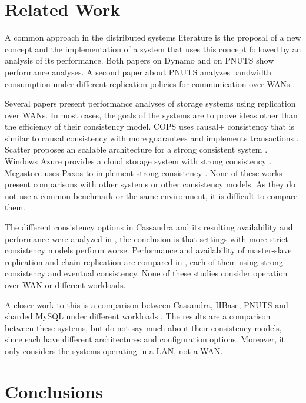 \documentclass[doublespacing]{bmcart}
\begin{document}
\section{Related Work}

A common approach in the distributed systems literature is the proposal of a new
concept and the implementation of a system that uses this concept followed by an
analysis of its performance. Both papers on Dynamo \cite{DeCandia2007} and on
PNUTS \cite{Cooper2008} show performance analyses. A second paper about PNUTS analyzes bandwidth consumption
under different replication policies for communication over WANs
\cite{Kadambi2011}.

Several papers present performance analyses of storage systems using replication
over WANs. In most cases, the goals of the systems are to prove ideas other than the
efficiency of their consistency model. COPS uses causal+ consistency
that is similar to causal consistency with more guarantees and implements
transactions \cite{Lloyd2011}. Scatter proposes an scalable architecture for a strong consistent system \cite{Glendenning2011}. Windows Azure provides a
cloud storage system with strong consistency \cite{Calder2011}. Megastore uses
Paxos to implement strong consistency \cite{Baker2011}. None of these works
present comparisons with other systems or other consistency models. As they do
not use a common benchmark or the same environment, it is difficult to compare them.

The different consistency options in Cassandra and its resulting availability and
performance were analyzed in \cite{Beyer2011}, the conclusion is that settings with
more strict consistency models perform worse. Performance and availability of
master-slave replication and chain replication are compared in
\cite{vanRenesse2004}, each of them using strong consistency and eventual
consistency. None of these studies consider operation over WAN or different
workloads.

A closer work to this is a comparison between Cassandra, HBase,
PNUTS and sharded MySQL under different workloads \cite{Cooper2010}. The results
are a comparison between these systems, but do not say much about their
consistency models, since each have different architectures and configuration
options. Moreover, it only considers the systems operating in a LAN, not a WAN.

\section{Conclusions}
\end{document}

